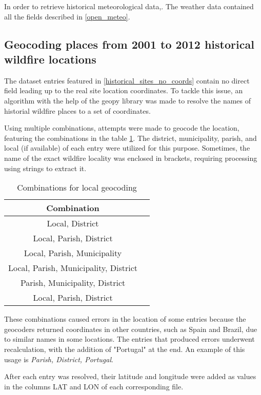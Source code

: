 In order to retrieve historical meteorological data,. The weather data contained all the fields described in \ref{open_meteo}. 

\subsection{Geocoding places from 2001 to 2012 historical wildfire locations}
\label{geocoding_historical}
The dataset entries featured in \ref{historical_sites_no_coords} contain no direct field leading up to the real site location coordinates. To tackle this issue, an algorithm with the help of the geopy library \cite{geopy} was made to resolve the names of historial wildfire places to a set of coordinates.


Using multiple combinations, attempts were made to geocode the location, featuring the combinations in the table \ref{geocoding_entries_2001_2012}. The district, municipality, parish, and local (if available) of each entry were utilized for this purpose. Sometimes, the name of the exact wildfire locality was enclosed in brackets, requiring processing using strings to extract it.



\begin{table}[h!]
	\caption{Combinations for local geocoding}
	\label{geocoding_entries_2001_2012}
	\centering
	\small
	\begin{tabular}{cp{7.5cm}|}
		\hline
		\textbf{Combination}\\
		\hline
		Local, District\\
		\hline
		Local, Parish, District\\
		\hline
		Local, Parish, Municipality\\
		\hline
		Local, Parish, Municipality, District\\
		\hline
		Parish, Municipality, District\\
		\hline
		Local, Parish, District\\
		\hline
	\end{tabular}
\end{table}


These combinations caused errors in the location of some entries because the geocoders returned coordinates in other countries, such as Spain and Brazil, due to similar names in some locations. The entries that produced errors underwent recalculation, with the addition of "Portugal" at the end. An example of this usage is  {\it Parish, District, Portugal}.

After each entry was resolved, their latitude and longitude were added as values in the columns LAT and LON of each corresponding file.


